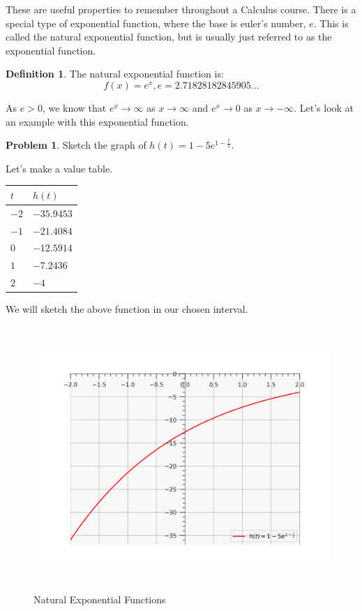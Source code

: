\documentclass[12pt]{article}
\theoremstyle{definition}
\newtheorem{problem}{Problem}
\newtheorem{definition}{Definition}
\begin{document}
These are useful properties to remember throughout a Calculus course.
There is a special type of exponential function, where the base is euler's number, $e$.
This is called the natural exponential function, but is usually just referred to as the exponential function.

\begin{definition}
    The natural exponential function is:
    \begin{equation*}
        f(x) = e^x, e=2.71828182845905 \dots
    \end{equation*}
\end{definition}

As $e>0$, we know that $e^x \rightarrow \infty$ as $x \rightarrow \infty$ and $e^x \rightarrow 0$ as $x \rightarrow -\infty$.
Let's look at an example with this exponential function.

\begin{problem}
Sketch the graph of $h(t) = 1 - 5e^{1-\frac{t}{2}}$.
\end{problem}

Let's make a value table.

\begin{table}[]
    \renewcommand{\arraystretch}{1.5}
    \centering
    \begin{tabular}{>{\centering\arraybackslash}m{1cm}|>{\centering\arraybackslash}m{2cm}}
        $t$  & $h(t)$     \\ \hline
        $-2$ & $-35.9453$ \\
        $-1$ & $-21.4084$ \\
        $0$  & $-12.5914$ \\
        $1$  & $	-7.2436$ \\
        $2$  & $	-4$
    \end{tabular}
\end{table}

We will sketch the above function in our chosen interval.

\begin{figure}[H]
    \centering
    \includegraphics[width=12.5cm, height=10cm]{exponential_functions_2.png}
    \caption{Natural Exponential Functions}
    \label{fig:fig2}
\end{figure}
\end{document}
